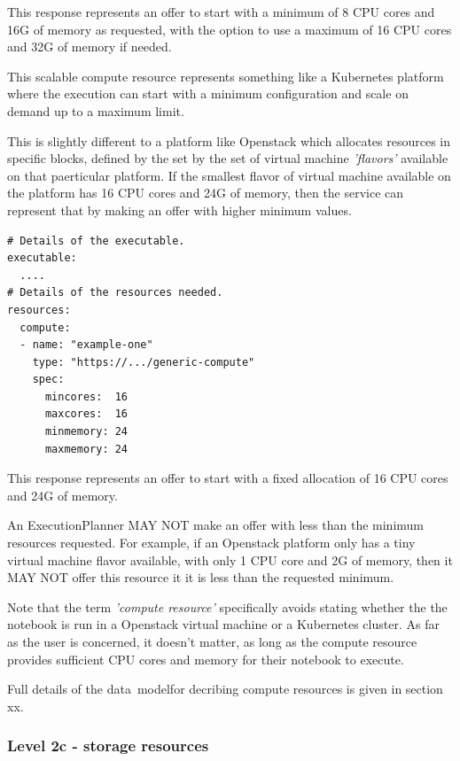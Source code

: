 \documentclass[11pt,a4paper]{ivoa}
\newcommand{\datamodel} {data~model}
\newcommand{\execplanner} {ExecutionPlanner}
\newcommand{\openstack} {Openstack}
\newcommand{\kubernetes} {Kubernetes}
\newcommand{\cpu} {CPU}
\newcommand{\scalable} {scalable}
\begin{document}
This response represents an offer to start with a minimum of 8 \cpu{} cores and 16G of memory
as requested, with the option to use a maximum of 16 \cpu{} cores and 32G of memory if needed.

This \scalable{} compute resource represents something like a \kubernetes{} platform where the
execution can start with a minimum configuration and scale on demand up to a maximum limit.

This is slightly different to a platform like \openstack{} which allocates resources
in specific blocks, defined by the set by the set of virtual machine \textit{'flavors'}
available on that paerticular platform.
If the smallest flavor of virtual machine available on the platform has 16 \cpu{} cores and 24G of memory,
then the service can represent that by making an offer with higher minimum values.

\begin{lstlisting}[]
# Details of the executable.
executable:
  ....
# Details of the resources needed.
resources:
  compute:
  - name: "example-one"
    type: "https://.../generic-compute"
    spec:
      mincores:  16
      maxcores:  16
      minmemory: 24
      maxmemory: 24
\end{lstlisting}

This response represents an offer to start with a fixed allocation of 16 \cpu{} cores and 24G of memory.

An \execplanner{} MAY NOT make an offer with less than the minimum resources requested.
For example, if an \openstack{} platform only has a tiny virtual machine flavor available,
with only 1 \cpu{} core and 2G of memory, then it MAY NOT offer this resource it it is less than
the requested minimum.

Note that the term \textit{'compute resource'} specifically avoids stating whether the the
notebook is run in a \openstack{} virtual machine or a \kubernetes{} cluster.
As far as the user is concerned, it doesn't matter, as long as the compute resource provides
sufficient \cpu{} cores and memory for their notebook to execute.


Full details of the \datamodel for decribing compute resources is given in section xx.

\subsubsection{Level 2c - storage resources}
\label{storage-resources}
\end{document}
